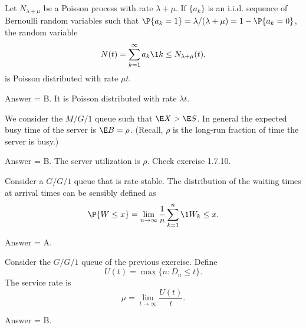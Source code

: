 \begin{exercise}[201902]
 Let $N_{\lambda+\mu}$ be a Poisson process with rate $\lambda+\mu$. If $\{a_k\}$ is an i.i.d. sequence of Bernoulli random variables such that $\P{a_k=1} = \lambda/(\lambda+\mu)=1-\P{a_k=0}$, the random variable
 \begin{equation*}
 N(t) = \sum_{k=1}^\infty a_k \1{k \leq N_{\lambda+\mu}(t)},
 \end{equation*}
is Poisson distributed with rate $\mu t$. 

\begin{solution}
Answer = B. It is Poisson distributed with rate $\lambda t$.
\end{solution}
\end{exercise}

\begin{exercise}[201902]
We consider the $M/G/1$ queue such that $\E X > \E S$. In general the expected busy time of the server is $\E B = \rho$. (Recall, $\rho$ is the long-run fraction of time the server is busy.)
\begin{solution}
Answer = B. The server utilization is $\rho$. Check exercise 1.7.10. 
\end{solution}
\end{exercise}

\begin{exercise}[201902]
Consider a $G/G/1$ queue that is rate-stable. The distribution of the waiting times at
 arrival times can be sensibly defined as
\begin{equation*}
 \P{W \leq x} = \lim_{n\to\infty} \frac 1n\sum_{k=1}^n \1{W_k\leq x}.
\end{equation*}

\begin{solution}
Answer = A.
\end{solution}
\end{exercise}

\begin{exercise}[201903]
Consider the $G/G/1$ queue of the previous exercise. Define
\begin{equation*}
 U(t) = \max\{n: D_n \leq t\}.
\end{equation*}
 The service rate is 
\begin{equation*}
 \mu = \lim_{t\to\infty} \frac{U(t)}t.
\end{equation*}

\begin{solution}
Answer = B.

\end{solution}
\end{exercise}

